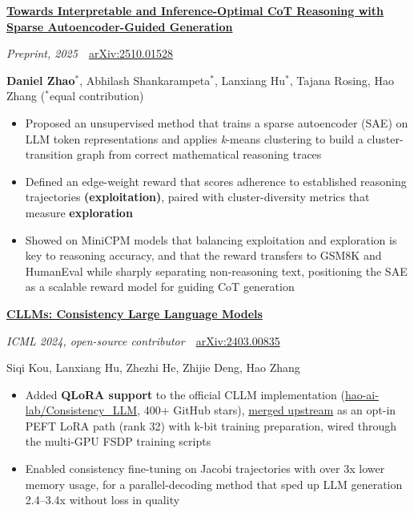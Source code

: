 \documentclass[letterpaper,11pt]{article}
\newcommand{\paper}[4]{%
  \needspace{6\baselineskip}%
  \textbf{\href{https://arxiv.org/abs/#2}{#1}}\par
  \textit{#3}\ \textbar\ \href{https://arxiv.org/abs/#2}{arXiv:#2}\par
  {\small #4\par}}
\newenvironment{bullets}
  {\begin{itemize}[leftmargin=1.2em, label=\textbullet, itemsep=0.5pt, parsep=0pt, topsep=2pt]}
  {\end{itemize}\vspace{5pt}}
\begin{document}
\paper{Towards Interpretable and Inference-Optimal CoT Reasoning with Sparse Autoencoder-Guided Generation}{2510.01528}
  {Preprint, 2025}
  {\textbf{Daniel Zhao}$^{*}$, Abhilash Shankarampeta$^{*}$, Lanxiang Hu$^{*}$, Tajana Rosing, Hao Zhang \quad ($^{*}$equal contribution)}
\begin{bullets}
  \item Proposed an unsupervised method that trains a sparse autoencoder (SAE) on LLM token representations and applies \textit{k}-means clustering to build a cluster-transition graph from correct mathematical reasoning traces
  \item Defined an edge-weight reward that scores adherence to established reasoning trajectories \textbf{(exploitation)}, paired with cluster-diversity metrics that measure \textbf{exploration}
  \item Showed on MiniCPM models that balancing exploitation and exploration is key to reasoning accuracy, and that the reward transfers to GSM8K and HumanEval while sharply separating non-reasoning text, positioning the SAE as a scalable reward model for guiding CoT generation
\end{bullets}

\paper{CLLMs: Consistency Large Language Models}{2403.00835}
  {ICML 2024, open-source contributor}
  {Siqi Kou, Lanxiang Hu, Zhezhi He, Zhijie Deng, Hao Zhang}
\begin{bullets}
  \item Added \textbf{QLoRA support} to the official CLLM implementation (\href{https://github.com/hao-ai-lab/Consistency_LLM}{hao-ai-lab/Consistency\_LLM}, 400+ GitHub stars), \href{https://github.com/hao-ai-lab/Consistency_LLM/pull/12}{merged upstream} as an opt-in PEFT LoRA path (rank 32) with k-bit training preparation, wired through the multi-GPU FSDP training scripts
  \item Enabled consistency fine-tuning on Jacobi trajectories with over 3x lower memory usage, for a parallel-decoding method that sped up LLM generation 2.4--3.4x without loss in quality
\end{bullets}
\end{document}
